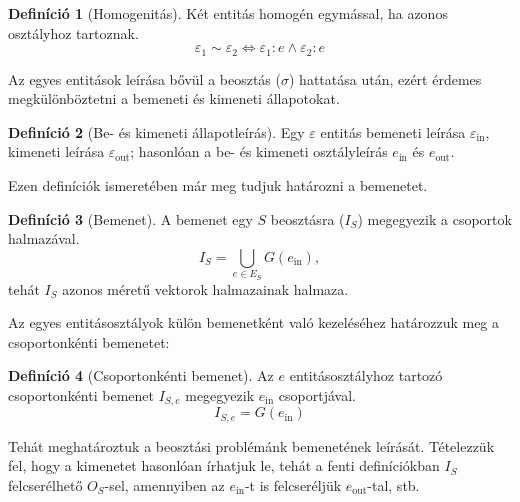 \documentclass{article}
\theoremstyle{definition}
\newtheorem{definition}{Definíció}[section]
\newcommand{\subin}[1]{ {#1}_{\text{in}} }
\newcommand{\subout}[1]{ {#1}_{\text{out}} }
\begin{document}
\begin{multicols}{2}
    \begin{definition}[Homogenitás]
        Két entitás homogén egymással, ha azonos osztályhoz tartoznak.
        \begin{equation}
            \varepsilon_1 \sim \varepsilon_2 \Longleftrightarrow \varepsilon_1 : e \wedge \varepsilon_2 : e
        \end{equation}
    \end{definition}
    
    Az egyes entitások leírása bővül a beosztás ($\sigma$) hattatása után, ezért érdemes megkülönböztetni a bemeneti és kimeneti állapotokat.
    
    \begin{definition}[Be- és kimeneti állapotleírás]
        Egy $\varepsilon$ entitás bemeneti leírása $\subin{\varepsilon}$, kimeneti leírása $\subout{\varepsilon}$; hasonlóan a be- és kimeneti osztályleírás $\subin{e}$ és $\subout{e}$.
    \end{definition}
    
    Ezen definíciók ismeretében már meg tudjuk határozni a bemenetet.
    
    \begin{definition}[Bemenet]
        A bemenet egy $S$ beosztásra ($I_S$) megegyezik a csoportok halmazával.
        \begin{equation}
            I_S = \bigcup_{e \in E_S} G(\subin{e}),
        \end{equation}
        tehát $I_S$ azonos méretű vektorok halmazainak halmaza.
    \end{definition}
    
    Az egyes entitásosztályok külön bemenetként való kezeléséhez határozzuk meg a csoportonkénti bemenetet:
    
    \begin{definition}[Csoportonkénti bemenet]
        Az $e$ entitásosztályhoz tartozó csoportonkénti bemenet $I_{S, e}$ megegyezik $\subin{e}$ csoportjával.
        \begin{equation}
            I_{S, e} = G(\subin{e})
        \end{equation}
    \end{definition}
    
    Tehát meghatároztuk a beosztási problémánk bemenetének leírását. Tételezzük fel, hogy a kimenetet hasonlóan írhatjuk le, tehát a fenti definíciókban $I_S$ felcserélhető $O_S$-sel, amennyiben az $\subin{e}$-t is felcseréljük $\subout{e}$-tal, stb.
    

\end{multicols}
\end{document}
